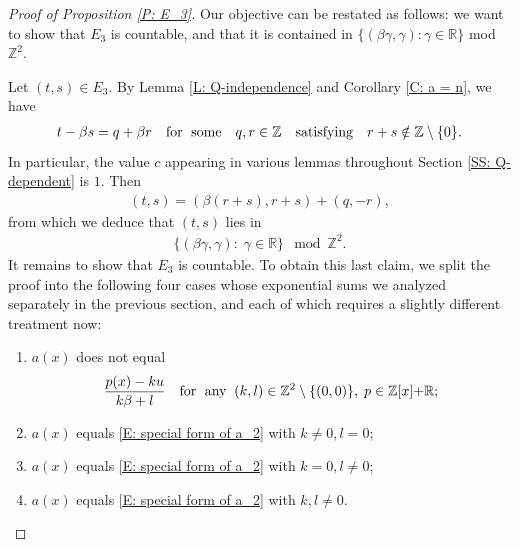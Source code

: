 \documentclass[11pt]{amsart}
\theoremstyle{definition}
\newcommand{\N}{{\mathbb N}}
\newcommand{\R}{{\mathbb R}}
\newcommand{\Z}{{\mathbb Z}}
\newcommand{\1}{{\mathbf{1}}}
\newcommand{\brac}[1]{\mathopen{}\left( #1 \mathclose{}\right)}
\begin{document}
     \begin{proof}[Proof of Proposition \ref{P: E_3}]
     Our objective can be restated as follows: we want to show that $E_3$ is countable, and that it is contained in $\{\brac{\beta \gamma, \gamma}: \gamma\in\R\}$ mod $\Z^2$.
    
     
     Let $(t,s)\in E_3$. By Lemma \ref{L: Q-independence} and Corollary \ref{C: a = n}, we have 
     \begin{align}\label{E: admissible (t,s)}
     t-\beta s = q + \beta r\quad \textrm{for\; some}\quad q,r\in\Z\quad \textrm{satisfying}\quad r+s\notin\Z\setminus\{0\}.
     \end{align}
     {In particular, the value $c$ appearing in various lemmas throughout Section \ref{SS: Q-dependent} is $1$.} Then
     \begin{align*}
         (t,s) = (\beta(r+s), r+s) + (q,-r),
     \end{align*}
     from which we deduce that $(t,s)$ lies in
     \begin{align}\label{E: hyperplane}
        \{(\beta \gamma, \gamma):\; \gamma\in\R\}\mod \Z^2.
     \end{align}
     It remains to show that $E_3$ is countable.
     To obtain this last claim, we split the proof into the following four cases whose exponential sums we analyzed separately in the previous section, and each of which requires a slightly different treatment now:
     \begin{enumerate}
    \item\label{i: a 1} $a(x)$ does not equal
    \begin{align}\label{E: special form of a_2}
        \frac{p(x)-ku}{k\beta + l} \quad \textrm{for\; any}\;\; (k, l)\in\Z^2\setminus{\{(0,0)\}},\; p\in\Z[x]{+\R}; %
    \end{align}
    \item\label{i: a 2} $a(x)$ equals \eqref{E: special form of a_2} with $k\neq 0, l=0$;
    \item\label{i: a 3} $a(x)$ equals \eqref{E: special form of a_2} with $k=0, l\neq 0$;
    \item\label{i: a 4} $a(x)$ equals \eqref{E: special form of a_2} with $k, l\neq 0$.
\end{enumerate}
     

\end{proof}
\end{document}
